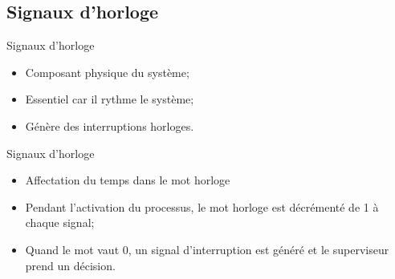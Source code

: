 \def\subsectitle{Signaux d'horloge}
\subsection{\subsectitle}

\begin{frame}{\sectitle}
\begin{block}{\subsectitle}
\begin{itemize}
    \item Composant physique du système;
    \item Essentiel car il rythme le système;
    \item Génère des interruptions horloges.
\end{itemize}
\end{block}


\begin{exampleblock}{\subsectitle}
\begin{itemize}
    \item Affectation du temps dans le mot horloge
    \item Pendant l'activation du processus, le mot horloge est décrémenté de 1
    à chaque signal;
    \item Quand le mot vaut 0, un signal d'interruption est généré et le
    superviseur prend un décision.
\end{itemize}
\end{exampleblock}

\end{frame}


